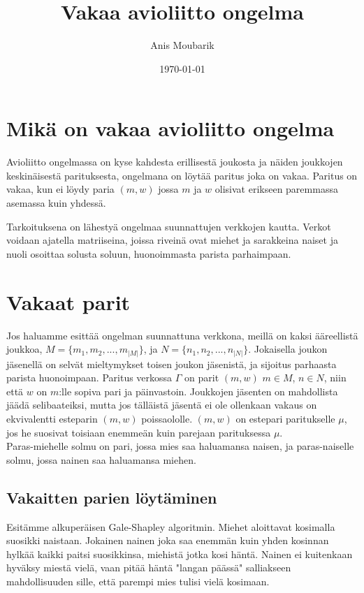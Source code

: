 \documentclass[finnish]{tktltiki2}
\title{Vakaa avioliitto ongelma}
\author{Anis Moubarik}
\date{\today}
\theoremstyle{definition}
\theoremstyle{remark}
\begin{document}

\maketitle        %
\makeabstract     %

\newpage          %



\section{Mikä on vakaa avioliitto ongelma}


Avioliitto ongelmassa on kyse kahdesta erillisestä joukosta ja näiden joukkojen keskinäisestä parituksesta, ongelmana on löytää paritus joka on vakaa. Paritus on vakaa, kun ei löydy paria $(m, w)$ jossa $m$ ja $w$ olisivat erikseen paremmassa asemassa kuin yhdessä.

Tarkoituksena on lähestyä ongelmaa suunnattujen verkkojen kautta. Verkot voidaan ajatella matriiseina, joissa riveinä ovat miehet ja sarakkeina naiset ja nuoli osoittaa solusta soluun, huonoimmasta parista parhaimpaan.


\section{Vakaat parit}
Jos haluamme esittää ongelman suunnattuna verkkona, meillä on kaksi ääreellistä joukkoa, 
$M = \{m_{1}, m_{2},..., m_{|M|}\}$, ja $N = \{n_{1}, n_{2},...,n_{|N|}\}$. Jokaisella joukon jäsenellä on selvät mieltymykset toisen joukon jäsenistä, ja sijoitus parhaasta parista huonoimpaan. Paritus verkossa $\Gamma$ on parit $(m, w)$ $m \in M$, $n \in N$, niin että $w$ on $m$:lle sopiva pari ja päinvastoin. Joukkojen jäsenten on mahdollista jäädä selibaateiksi, mutta jos tälläistä jäsentä ei ole ollenkaan vakaus on ekvivalentti esteparin $(m, w)$ poissaololle.
$(m, w)$ on estepari paritukselle $\mu$, jos he suosivat toisiaan enemmeän kuin parejaan parituksessa $\mu$.\\
Paras-miehelle solmu on pari, jossa mies saa haluamansa naisen, ja paras-naiselle solmu, jossa nainen saa haluamansa miehen.


\subsection{Vakaitten parien löytäminen}
Esitämme alkuperäisen Gale-Shapley algoritmin.
Miehet aloittavat kosimalla suosikki naistaan. Jokainen nainen joka saa enemmän kuin yhden kosinnan hylkää kaikki paitsi suosikkinsa, miehistä jotka kosi häntä. Nainen ei kuitenkaan hyväksy miestä vielä, vaan pitää häntä "langan päässä" salliakseen mahdollisuuden sille, että parempi mies tulisi vielä kosimaan.
\end{document}
